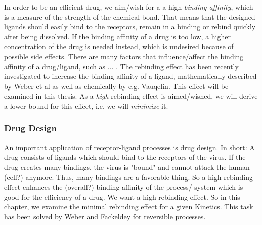 
In order to be an efficient drug, we aim/wish for a a high \textit{binding affinity}, which is a measure of the strength of the chemical bond.
That means that the designed ligands should easily bind to the receptors, remain in a binding or rebind quickly after being dissolved. If the binding affinity of a drug is too low, a higher concentration of the drug is needed instead,
which is undesired because of possible side effects.
There are many factors that influence/affect the binding affinity of a drug/ligand, such as ... .
The rebinding effect has been recently investigated to increase the binding affinity of a ligand, mathematically described by Weber et al\cite{weber2012, weber2014} as well as chemically by e.g. Vauqelin\cite{vauquelin2010}. This effect will be examined in this thesis. As a \textit{high} rebinding effect is aimed/wished, we will derive a lower bound for this effect, i.e. we will \textit{minimize} it.

\subsubsection*{Drug Design}

An important application of receptor-ligand processes is drug design. In short: A drug consists of ligands which should bind to the receptors of the virus. If the drug creates many bindings, the virus is "bound" and cannot attack the human (cell?) anymore. Thus, many bindings are a favorable thing. So a high rebinding effect enhances the (overall?) binding affinity of the process/ system which is good for the efficiency of a drug. We want a high rebinding effect.
So in this chapter, we examine the minimal rebinding effect for a given Kinetics.
This task has been solved by Weber and Fackeldey\cite{weber2014} for reversible processes.
